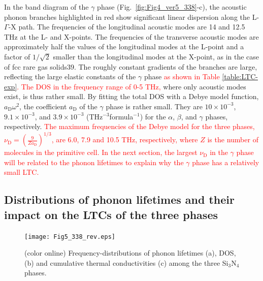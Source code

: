 \documentclass[twocolumn,amsmath,amssymb,a4paper,prb,superscriptaddress,floatfix]{revtex4-1}
\begin{document}
In the band diagram of the $\gamma$ phase
(Fig.~\ref{fig:Fig4_ver5_338}-c), the acoustic phonon branches
highlighted in red show significant linear dispersion along the
L-$\Gamma$-X path. The frequencies of the longitudinal acoustic modes
are 14 and 12.5 THz at the L- and X-points. The frequencies of the
transverse acoustic modes are approximately half the values of the
longitudinal modes at the L-point and a factor of $1/\sqrt{2}$ smaller
than the longitudinal modes at the X-point, as in the case of fcc rare
gas solids39. The roughly constant gradients of the branches are large,
reflecting the large elastic constants of the $\gamma$ phase
%
\textcolor{red}{as shown in Table \ref{table:LTC-exp}. The DOS in the
frequency range of 0-5 THz,}
%
where only acoustic modes exist, is thus rather small. By fitting the
total DOS with a Debye model function, $a_\text{D}\omega^2$, the
coefficient $a_\text{D}$ of the $\gamma$ phase is rather small. They are
$10\times 10^{-3}$, $9.1\times 10^{-3}$, and $3.9\times 10^{-3}$
(THz$^{-3}$formula$^{-1}$) for the $\alpha$, $\beta$, and $\gamma$
phases, respectively.
%
\textcolor{red}{The maximum frequencies of the Debye model for the three
phases, $\nu_\text{D}=\left(\frac{9}{Za_\text{D}} \right)^{1/3}$, are
6.0, 7.9 and 10.5 THz, respectively, where $Z$ is the number of molecules
in the primitive cell. In the next section, the largest $\nu_\text{D}$
in the $\gamma$ phase will be related to the phonon lifetimes to explain
why the $\gamma$ phase has a relatively small LTC.}

\subsection{Distributions of phonon lifetimes and their impact on the
  LTCs of the three phases}

\begin{figure}[ht]
 \begin{center}
  \texttt{[image: Fig5\_338\_rev.eps]}
  \caption{(color online) Frequency-distributions of phonon lifetimes
  (a), DOS, (b) and cumulative thermal conductivities (c) among the
  three Si$_3$N$_4$ phases. \label{fig:Fig5_338_rev} }
 \end{center}
\end{figure}
\end{document}
